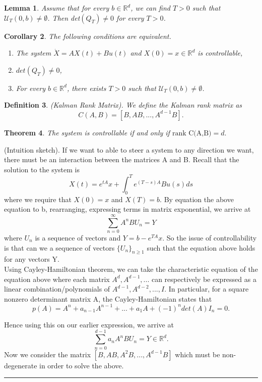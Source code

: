 \documentclass[twoside]{article}
\newcounter{lecnum}
\newtheorem{theorem}{Theorem}[lecnum]
\newtheorem{lemma}[theorem]{Lemma}
\newtheorem{corollary}[theorem]{Corollary}
\newtheorem{definition}[theorem]{Definition}
\newenvironment{proof}{{\bf Proof:}}{\hfill\rule{2mm}{2mm}}
\begin{document}
\begin{lemma}Assume that for every $b \in \mathbb{R}^d$, we can find $T > 0$ such that $\mathcal{U}_T(0,b) \neq \emptyset$. Then det$(Q_T) \neq 0$ for every $T > 0$.
\end{lemma}

\begin{corollary}The following conditions are equivalent.
\begin{enumerate}
\item The system $\dot{X} = AX(t) + Bu(t)$ and $X(0) = x \in \mathbb{R}^d$ is controllable,
\item $det(Q_T) \neq 0$,
\item For every $b \in \mathbb{R}^d$, there exists $T>0$ such that $\mathcal{U}_T(0,b) \neq \emptyset$.
\end{enumerate}
\end{corollary}

\begin{definition}(Kalman Rank Matrix). We define the Kalman rank matrix as 
$$
C(A,B) = [B, AB, ..., A^{d-1}B].
$$
\end{definition}
\begin{theorem}The system is controllable if and only if 
$
\text{rank C(A,B)} = d.
$
\end{theorem}

\begin{proof}(Intuition sketch). If we want to able to steer a system to any direction we want, there must be an interaction between the matrices A and B. Recall that the solution to the system is 
$$
X(t) = e^{tA}x + \int_{0}^{T}e^{(T-s)A}Bu(s)ds
$$
where we require that $X(0) = x$ and $X(T) = b$. By equation the above equation to b, rearranging, expressing terms in matrix exponential, we arrive at
$$
\sum_{n=0}^{\infty}A^nBU_n = Y
$$
where $U_n$ is a sequence of vectors and $Y = b - e^{TA}x$. So the issue of controllability is that can we a sequence of vectors $\{U_n\}_{n \geq 1}$ such that the equation above holds for any vectors Y. \\ Using Cayley-Hamiltonian theorem, we can take the characteristic equation of the equation above where each matrix $A^d, A^{d-1},...$ can respectively be expressed as a linear combination/polynomials of $A^{d-1},A^{d-2},...,I$. In particular, for a square nonzero determinant matrix A, the Cayley-Hamiltonian states that 
$$
p(A) = A^n + a_{n-1}A^{n-1} + ... + a_1A + (-1)^ndet(A)I_n = 0.
$$

Hence using this on our earlier expression, we arrive at 
$$
\sum_{n=0}^{d-1}a_nA^nBU_n = Y \in \mathbb{R}^d.
$$
Now we consider the matrix $[B,AB,A^2B,...,A^{d-1}B]$ which must be non-degenerate in order to solve the above.
\end{proof}
\end{document}
